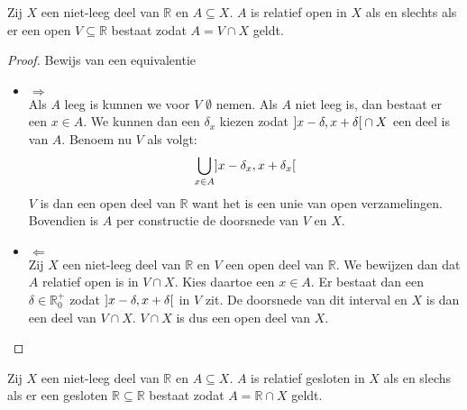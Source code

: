 \documentclass[main.tex]{subfiles}
\begin{document}
\begin{bpr}
  Zij $X$ een niet-leeg deel van $\mathbb{R}$ en $A \subseteq X$.
  $A$ is relatief open in $X$ als en slechts als er een open $V\subseteq \mathbb{R}$ bestaat zodat $A=V \cap X$ geldt.

  \begin{proof}
    Bewijs van een equivalentie\\
    \begin{itemize}
    \item $\Rightarrow$\\
      Als $A$ leeg is kunnen we voor $V$ $\emptyset$ nemen.
      Als $A$ niet leeg is, dan bestaat er een $x\in A$.
      We kunnen dan een $\delta_{x}$ kiezen zodat $\interval[open]{x-\delta}{x+\delta} \cap X$ een deel is van $A$.
      Benoem nu $V$ als volgt:
      \[ \bigcup_{x\in A}\interval[open]{x-\delta_{x}}{x+\delta_{x}} \]
      $V$ is dan een open deel van $\mathbb{R}$ want het is een unie van open verzamelingen.
      Bovendien is $A$ per constructie de doorsnede van $V$ en $X$.
    \item $\Leftarrow$\\
      Zij $X$ een niet-leeg deel van $\mathbb{R}$ en $V$ een open deel van $\mathbb{R}$.
      We bewijzen dan dat $A$ relatief open is in $V\cap X$.
      Kies daartoe een $x\in A$. Er bestaat dan een $\delta\in \mathbb{R}_{0}^{+}$ zodat $\interval[open]{x-\delta}{x+\delta}$ in $V$ zit.
      De doorsnede van dit interval en $X$ is dan een deel van $V \cap X$.
      $V\cap X$ is dus een open deel van $X$.
    \end{itemize}
  \end{proof}
\end{bpr}

\begin{pr}
  Zij $X$ een niet-leeg deel van $\mathbb{R}$ en $A \subseteq X$.
  $A$ is relatief gesloten in $X$ als en slechs als er een gesloten $\mathbb{R} \subseteq \mathbb{R}$ bestaat zodat $A=\mathbb{R} \cap X$ geldt.
\end{pr}

\end{document}
